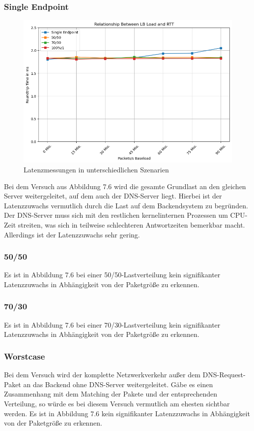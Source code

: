 \subsubsection{Single Endpoint}
\begin{figure}
    \centering
    \includegraphics[width=0.9\linewidth]{images/latency.png}
    \caption{Latenzmessungen in unterschiedlichen Szenarien}
    \label{fig:enter-label}
\end{figure}
Bei dem Versuch aus Abbildung 7.6 wird die gesamte Grundlast an den gleichen Server weitergeleitet, auf dem auch der DNS-Server liegt. Hierbei ist der Latenzzuwachs vermutlich durch die Last auf dem Backendsystem zu begründen. Der DNS-Server muss sich mit den restlichen kernelinternen Prozessen um CPU-Zeit streiten, was sich in teilweise schlechteren Antwortzeiten bemerkbar macht. Allerdings ist der Latenzzuwachs sehr gering.
\subsubsection{50/50}

Es ist in Abbildung 7.6 bei einer 50/50-Lastverteilung kein signifikanter Latenzzuwachs in Abhängigkeit von der Paketgröße zu erkennen.
\subsubsection{70/30}

Es ist in Abbildung 7.6 bei einer 70/30-Lastverteilung kein signifikanter Latenzzuwachs in Abhängigkeit von der Paketgröße zu erkennen.
\subsubsection{Worstcase}
Bei dem Versuch wird der komplette Netzwerkverkehr außer dem DNS-Request-Paket an das Backend ohne DNS-Server weitergeleitet. Gäbe es einen Zusammenhang mit dem Matching der Pakete und der entsprechenden Verteilung, so würde es bei diesem Versuch vermutlich am ehesten sichtbar werden.
Es ist in Abbildung 7.6 kein signifikanter Latenzzuwachs in Abhängigkeit von der Paketgröße zu erkennen.
